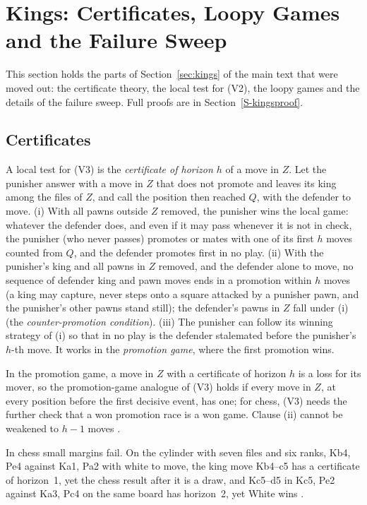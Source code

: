\section{Kings: Certificates, Loopy Games and the Failure Sweep}\label{S-kings}
This section holds the parts of Section~\ref{sec:kings} of the main text that were moved out: the certificate theory, the local test for (V2), the loopy games and the details of the failure sweep. Full proofs are in Section~\ref{S-kingsproof}.
\subsection{Certificates}
A local test for (V3) is the \emph{certificate of horizon $h$} of a move in $Z$. Let the punisher answer with a move in $Z$ that does not promote and leaves its king among
the files of $Z$, and call the position then reached $Q$, with the defender to move. (i) With all pawns outside $Z$ removed, the punisher wins the local game: whatever the defender does, and
even if it may pass whenever it is not in check, the punisher (who never passes) promotes or mates with one of its first $h$ moves counted from $Q$, and the defender promotes first
in no play. (ii) With the punisher's king and all pawns in $Z$ removed, and the defender alone to move, no sequence of defender king and pawn moves ends in a promotion within $h$
moves (a king may capture, never steps onto a square attacked by a punisher pawn, and the punisher's other pawns stand still); the defender's pawns in $Z$ fall under (i) (the \emph{counter-promotion condition}). (iii)
The punisher can follow its winning strategy of (i) so that in no play is the defender stalemated before the punisher's $h$-th move. It works in the \emph{promotion game}, where the first promotion wins.

\begin{theorem}[\lab{S}]\label{thm:cert}
In the promotion game, a move in $Z$ with a certificate of horizon $h$ is a loss for its mover, so the
promotion-game analogue of (V3) holds if every move in $Z$, at every position before the first decisive event, has one; for chess, (V3) needs the further
check that a won promotion race is a won game. Clause (ii) cannot be weakened to $h-1$ moves .
\end{theorem}

In chess small margins fail. On the cylinder with seven files and six ranks, Kb4, Pe4 against Ka1, Pa2 with
white to move, the king move Kb4--c5 has a certificate of horizon~1, yet the chess result after it is a draw, and
Kc5--d5 in Kc5, Pe2 against Ka3, Pc4 on the same board has horizon~2, yet White wins .

